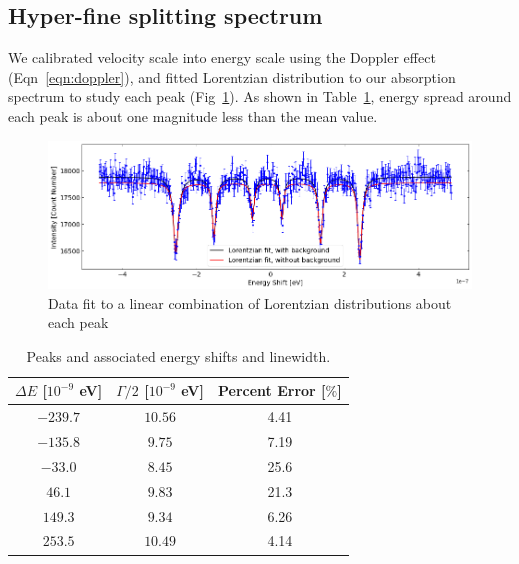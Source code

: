 \documentclass[letterpaper,12pt]{article}
\begin{document}
\subsection{Hyper-fine splitting spectrum}
    We calibrated velocity scale into energy scale using the Doppler effect (Eqn~\ref{eqn:doppler}), and fitted Lorentzian distribution to our absorption spectrum to study each peak (Fig~\ref{fig:lorentz_left}). As shown in Table~\ref{tbl:lorentz_fit}, energy spread around each peak is about one magnitude less than the mean value.

    
    \begin{figure}[ht] 
            \centering \includegraphics[width=1\columnwidth]{lorentz_left.png}
            \caption{
                    \label{fig:lorentz_left} Data fit to a linear combination of Lorentzian distributions about each peak%
            }
    \end{figure}

\begin{table}[H]
\begin{center}
\caption{Peaks and associated energy shifts and linewidth.}
\label{tbl:lorentz_fit} %
\begin{tabular}{ccc}
\multicolumn{1}{c}{$\Delta E$ [$10^{-9}$ eV]} & \multicolumn{1}{c}{$\Gamma / 2$ [$10^{-9}$ eV]} & \multicolumn{1}{c}{Percent Error [$\%$]} \\
\hline
$-239.7$ & $10.56$ & 4.41\\
$-135.8$ & $9.75$ & 7.19\\
$-33.0$ & $8.45$ & 25.6\\
$46.1$ & $9.83$ & 21.3\\
$149.3$ & $9.34$ & 6.26\\
$253.5$ & $10.49$ & 4.14\\
\hline
\end{tabular}
\end{center}
\end{table}
\end{document}
